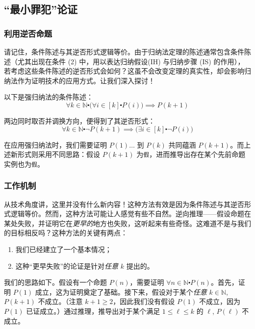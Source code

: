\subsection{``最小罪犯''论证}\label{sec:section5.5.1}

\subsubsection*{利用逆否命题}

请记住，条件陈述与其逆否形式逻辑等价。由于归纳法定理的陈述通常包含条件陈述（尤其出现在条件 (2) 中，用以表达归纳假设(IH) 与归纳步骤 (IS) 的作用），若考虑这些条件陈述的逆否形式会如何？这虽不会改变定理的真实性，却会影响归纳法作为证明技术的应用方式。让我们深入探讨！

以下是强归纳法的条件陈述：
\[\forall k \in \mathbb{N} \centerdot \big(\forall i \in [k] \centerdot P(i)\big) \implies P(k+1)\]

两边同时取否并调换方向，便得到了其逆否形式：
\[\forall k \in \mathbb{N} \centerdot \neg P(k+1) \implies \big(\exists i \in [k] \centerdot \neg P(i)\big)\]

在应用强归纳法时，我们需要证明 $P(1) \dots$ 到 $P(k)$ 共同蕴涵 $P(k+1)$。而上述新形式则采用不同思路：假设 $P(k+1)$ 为\verb|假|，进而推导出存在某个先前命题实例也为\verb|假|。

\subsubsection*{工作机制}

从技术角度讲，这里并没有什么新内容！这种方法有效是因为条件陈述与其逆否形式逻辑等价。然而，这种方法可能让人感觉有些不自然。逆向推理——假设命题在某处失败，并证明它在\emph{更早的}地方也失败，这听起来有些奇怪。这难道不是与我们的目标相反吗？这种方法的关键有两点：
\begin{enumerate}[label=(\arabic*)]
    \item 我们已经建立了一个基本情况；
    \item 这种``更早失败''的论证是针对\emph{任意} $k$ 提出的。
\end{enumerate}

我们的思路如下。假设有一个命题 $P(n)$，需要证明 $\forall n \in \mathbb{N} \centerdot P(n)$。首先，证明 $P(1)$ 成立，这为证明奠定了基础。接下来，假设对于某个\emph{任意} $k \in \mathbb{N}$, $P(k+1)$ 不成立。（注意 $k + 1 \ge 2$，因此我们没有假设 $P(1)$ 不成立，因为 $P(1)$ 已证成立。）通过推理，推导出对于某个满足 $1 \le \ell \le k$ 的 $\ell$, $P(\ell)$ 不成立。

